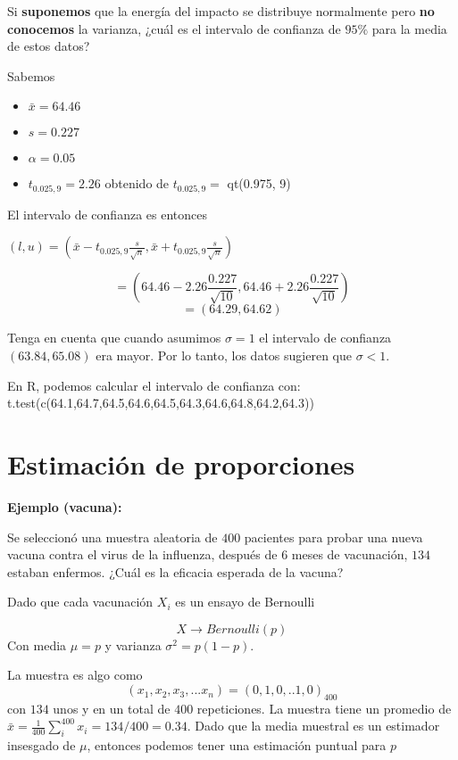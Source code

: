 \documentclass[
]{book}
\providecommand{\tightlist}{%
  \setlength{\itemsep}{0pt}\setlength{\parskip}{0pt}}
\begin{document}
Si \textbf{suponemos} que la energía del impacto se distribuye normalmente pero \textbf{no conocemos} la varianza, ¿cuál es el intervalo de confianza de \(95\%\) para la media de estos datos?

Sabemos

\begin{itemize}
\tightlist
\item
  \(\bar{x}=64.46\)
\item
  \(s=0.227\)
\item
  \(\alpha=0.05\)
\item
  \(t_{0.025,9}=2.26\) obtenido de \(t_{0.025,9}=\) qt(0.975, 9)
\end{itemize}

El intervalo de confianza es entonces

\((l,u)=(\bar{x}- t_{0.025,9}\frac{s}{\sqrt{n}},\bar{x}+t_{0.025,9} \frac{s} {\sqrt{n}})\)

\[=(64.46-2.26 \frac{0.227}{\sqrt{10}},64.46+2.26 \frac{0.227}{\sqrt{10}})\] \[=(64.29,64.62)\]

Tenga en cuenta que cuando asumimos \(\sigma=1\) el intervalo de confianza \((63.84,65.08)\) era mayor. Por lo tanto, los datos sugieren que \(\sigma<1\).

En R, podemos calcular el intervalo de confianza con: t.test(c(64.1,64.7,64.5,64.6,64.5,64.3,64.6,64.8,64.2,64.3))

\hypertarget{estimaciuxf3n-de-proporciones}{%
\section{Estimación de proporciones}\label{estimaciuxf3n-de-proporciones}}

\textbf{Ejemplo (vacuna):}

Se seleccionó una muestra aleatoria de \(400\) pacientes para probar una nueva vacuna contra el virus de la influenza, después de \(6\) meses de vacunación, \(134\) estaban enfermos. ¿Cuál es la eficacia esperada de la vacuna?

Dado que cada vacunación \(X_i\) es un ensayo de Bernoulli

\[X \rightarrow Bernoulli(p)\]
Con media \(\mu=p\) y varianza \(\sigma^2=p(1-p)\).

La muestra es algo como
\[(x_1,x_2, x_3, ...x_n)=(0,1,0,.. 1, 0)_{400}\] con \(134\) unos y en un total de \(400\) repeticiones. La muestra tiene un promedio de \(\bar{x}=\frac{1}{400}\sum_i^{400} x_i=134/400=0.34\). Dado que la media muestral es un estimador insesgado de \(\mu\), entonces podemos tener una estimación puntual para \(p\)
\end{document}
